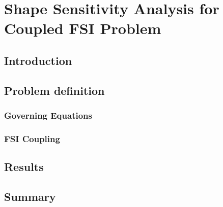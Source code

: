 \chapter{Shape Sensitivity Analysis for Coupled FSI Problem}

\section{Introduction}
\section{Problem definition}
\subsection{Governing Equations}
\subsection{FSI Coupling}
\section{Results}
\section{Summary}
